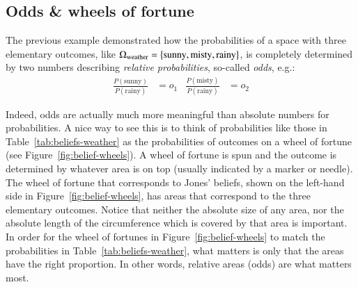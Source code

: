 \documentclass[nobib,nofonts]{tufte-handout}
\begin{document}
\subsection{Odds \& wheels of fortune}

The previous example demonstrated how the probabilities of a space with three elementary outcomes, like $\Omega_{\text{weather}} = \left\{\text{sunny}, \text{misty}, \text{rainy}\right\}$, is completely determined by two numbers describing \emph{relative probabilities}, so-called \emph{odds}, e.g.:
\begin{align*}
  \frac{P(\text{sunny})}{P(\text{rainy})} & = o_{1} & \frac{P(\text{misty})}{P(\text{rainy})} & = o_{2}
\end{align*}

Indeed, odds are actually much more meaningful than absolute numbers for probabilities.
A nice way to see this is to think of probabilities like those in Table~\ref{tab:beliefs-weather} as the probabilities of outcomes on a wheel of fortune (see Figure~\ref{fig:belief-wheels}).
A wheel of fortune is spun and the outcome is determined by whatever area is on top (usually indicated by a marker or needle).
The wheel of fortune that corresponds to Jones' beliefs, shown on the left-hand side in Figure~\ref{fig:belief-wheels}, has areas that correspond to the three elementary outcomes.
Notice that neither the absolute size of any area, nor the absolute length of the circumference which is covered by that area is important.
In order for the wheel of fortunes in Figure~\ref{fig:belief-wheels} to match the probabilities in Table~\ref{tab:beliefs-weather}, what matters is only that the areas have the right proportion.
In other words, relative areas (odds) are what matters most.
\end{document}
